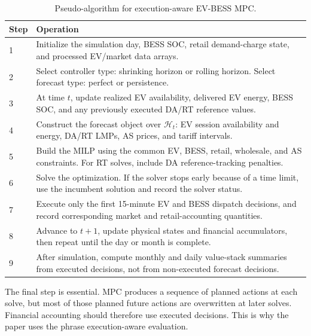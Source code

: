 \documentclass[final,5p,times]{elsarticle}
\newcommand{\calH}{\mathcal{H}}
\begin{document}
\begin{table}[!t]
\centering
\caption{Pseudo-algorithm for execution-aware EV-BESS MPC.}
\label{tab:pseudo_algorithm}
\scriptsize
\begin{tabularx}{\textwidth}{@{}p{}X@{}}
\toprule
Step & Operation \\
\midrule
1 & Initialize the simulation day, BESS SOC, retail demand-charge state, and processed EV/market data arrays.\\
2 & Select controller type: shrinking horizon or rolling horizon. Select forecast type: perfect or persistence.\\
3 & At time $t$, update realized EV availability, delivered EV energy, BESS SOC, and any previously executed DA/RT reference values.\\
4 & Construct the forecast object over $\calH_t$: EV session availability and energy, DA/RT LMPs, AS prices, and tariff intervals.\\
5 & Build the MILP using the common EV, BESS, retail, wholesale, and AS constraints. For RT solves, include DA reference-tracking penalties.\\
6 & Solve the optimization. If the solver stops early because of a time limit, use the incumbent solution and record the solver status.\\
7 & Execute only the first 15-minute EV and BESS dispatch decisions, and record corresponding market and retail-accounting quantities.\\
8 & Advance to $t+1$, update physical states and financial accumulators, then repeat until the day or month is complete.\\
9 & After simulation, compute monthly and daily value-stack summaries from executed decisions, not from non-executed forecast decisions.\\
\bottomrule
\end{tabularx}
\end{table}

The final step is essential. MPC produces a sequence of planned actions at each solve, but most of those planned future actions are overwritten at later solves. Financial accounting should therefore use executed decisions. This is why the paper uses the phrase execution-aware evaluation.
\end{document}
